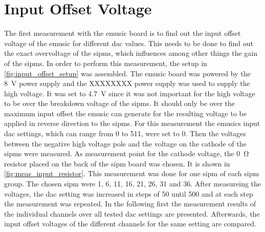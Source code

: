 \section{Input Offset Voltage}
The first measurement with the \ac{emusic} board is to find out the input offset voltage of the \ac{emusic} for different \ac{dac} values.
This needs to be done to find out the exact overvoltage of the \acp{sipm}, which influences among other things the gain of the \acp{sipm}.
In order to perform this measurement, the setup in \autoref{fig:input_offset_setup} was assembled.
The \ac{emusic} board was powered by the \SI{8}{\volt} power supply and the XXXXXXXX power supply was used to supply the high voltage.
It was set to \SI{4.7}{\volt} since it was not important for the high voltage to be over the breakdown voltage of the \acp{sipm}.
It should only be over the maximum input offset the \ac{emusic} can generate for the resulting voltage to be applied in reverse direction to the \acp{sipm}.
For this measurement the \ac{emusic}s input \ac{dac} settings, which can range from 0 to 511, were set to 0.
Then the voltages between the negative high voltage pole and the voltage on the cathode of the \acp{sipm} were measured.
As measurement point for the cathode voltage, the \SI{0}{\ohm} resistor placed on the back of the \ac{sipm} board was chosen.
It is shown in \autoref{fig:meas_input_resistor}.
This measurement was done for one \ac{sipm} of each \ac{sipm} group.
The chosen \ac{sipm} were 1, 6, 11, 16, 21, 26, 31 and 36.
After measureing the voltages, the \ac{dac} setting was increased in steps of \SI{50}{\dacu} until \SI{500}{\dacu} and at each step the measurement was repeated.
In the following first the measurement results of the individual channels over all tested \ac{dac} settings are presented.
Afterwards, the input offset voltages of the different channels for the same setting are compared.

